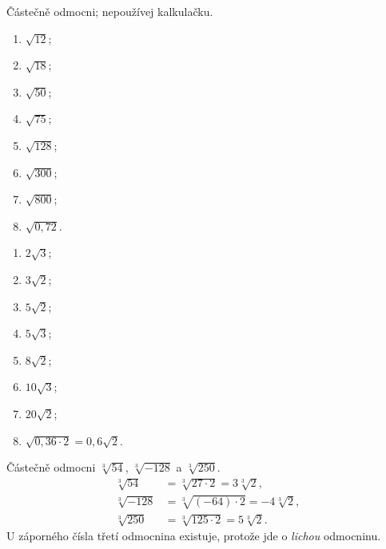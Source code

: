 \documentclass[11pt,a4paper]{article}
\begin{document}
\begin{zadaniReseniBox}[breakable=false,title={Samostatná práce 1: druhé odmocniny}]
Částečně odmocni; nepoužívej kalkulačku.
\begin{enumerate}[label=\alph*)]
\item $\sqrt{12}$; \item $\sqrt{18}$; \item $\sqrt{50}$; \item $\sqrt{75}$;
\item $\sqrt{128}$; \item $\sqrt{300}$; \item $\sqrt{800}$; \item $\sqrt{0{,}72}$.
\end{enumerate}
\tcblower
\begin{enumerate}[label=\alph*)]
\item $2\sqrt3$; \item $3\sqrt2$; \item $5\sqrt2$; \item $5\sqrt3$;
\item $8\sqrt2$; \item $10\sqrt3$; \item $20\sqrt2$;
\item $\sqrt{0{,}36\cdot2}=0{,}6\sqrt2$.
\end{enumerate}
\end{zadaniReseniBox}

\begin{prikladReseniBox}[breakable=false,title={Příklad 2: vyjmutí třetí mocniny}]
Částečně odmocni $\sqrt[3]{54}$, $\sqrt[3]{-128}$ a $\sqrt[3]{250}$.
\tcblower
\[
\begin{aligned}
\sqrt[3]{54}&=\sqrt[3]{27\cdot2}=3\sqrt[3]2,\\
\sqrt[3]{-128}&=\sqrt[3]{(-64)\cdot2}=-4\sqrt[3]2,\\
\sqrt[3]{250}&=\sqrt[3]{125\cdot2}=5\sqrt[3]2.
\end{aligned}
\]
U záporného čísla třetí odmocnina existuje, protože jde o \emph{lichou} odmocninu.
\end{prikladReseniBox}
\end{document}
